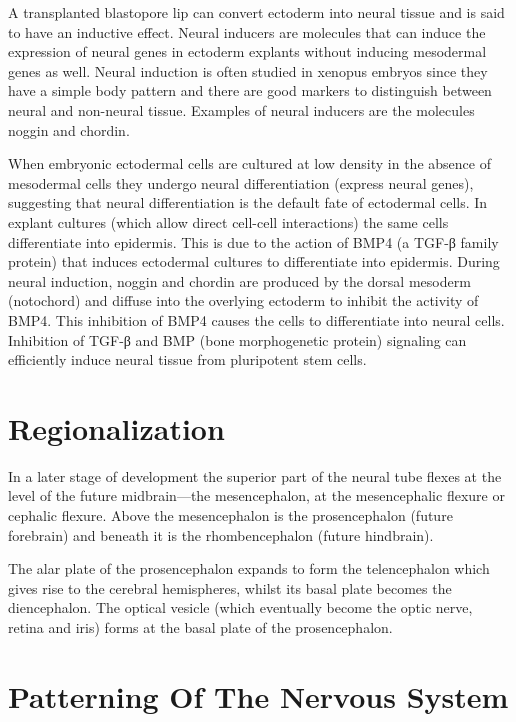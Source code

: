 A transplanted blastopore lip can convert ectoderm into neural tissue and is said to have an inductive effect. Neural inducers are molecules that can induce the expression of neural genes in ectoderm explants without inducing mesodermal genes as well. Neural induction is often studied in xenopus embryos since they have a simple body pattern and there are good markers to distinguish between neural and non-neural tissue. Examples of neural inducers are the molecules noggin and chordin.

When embryonic ectodermal cells are cultured at low density in the absence of mesodermal cells they undergo neural differentiation (express neural genes), suggesting that neural differentiation is the default fate of ectodermal cells. In explant cultures (which allow direct cell-cell interactions) the same cells differentiate into epidermis. This is due to the action of BMP4 (a TGF-β family protein) that induces ectodermal cultures to differentiate into epidermis. During neural induction, noggin and chordin are produced by the dorsal mesoderm (notochord) and diffuse into the overlying ectoderm to inhibit the activity of BMP4. This inhibition of BMP4 causes the cells to differentiate into neural cells. Inhibition of TGF-β and BMP (bone morphogenetic protein) signaling can efficiently induce neural tissue from pluripotent stem cells.

\hypertarget{regionalization}{%
\section{Regionalization}\label{regionalization}}

In a later stage of development the superior part of the neural tube flexes at the level of the future midbrain---the mesencephalon, at the mesencephalic flexure or cephalic flexure. Above the mesencephalon is the prosencephalon (future forebrain) and beneath it is the rhombencephalon (future hindbrain).

The alar plate of the prosencephalon expands to form the telencephalon which gives rise to the cerebral hemispheres, whilst its basal plate becomes the diencephalon. The optical vesicle (which eventually become the optic nerve, retina and iris) forms at the basal plate of the prosencephalon.

\hypertarget{patterning-of-the-nervous-system}{%
\section{Patterning Of The Nervous System}\label{patterning-of-the-nervous-system}}

